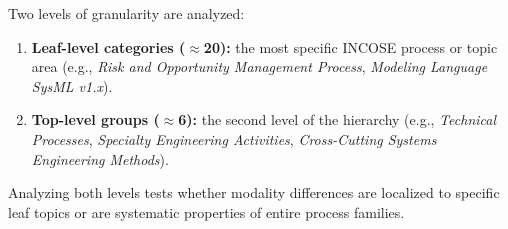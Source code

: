 Two levels of granularity are analyzed:

\begin{enumerate}[nosep]
    \item \textbf{Leaf-level categories ($\approx$20):} the most specific INCOSE process or topic area (e.g., \textit{Risk and Opportunity Management Process}, \textit{Modeling Language SysML v1.x}).
    \item \textbf{Top-level groups ($\approx$6):} the second level of the hierarchy (e.g., \textit{Technical Processes}, \textit{Specialty Engineering Activities}, \textit{Cross-Cutting Systems Engineering Methods}).
\end{enumerate}

Analyzing both levels tests whether modality differences are localized to specific leaf topics or are systematic properties of entire process families.


